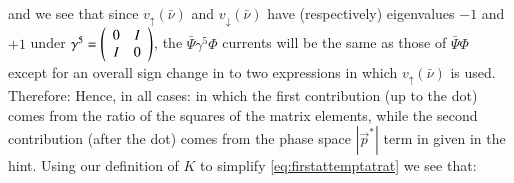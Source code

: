 \begin{allparts}
{}%
%
%
%
%
%
%
and we see that since $v_\uparrow(\bar \nu)$  and $v_\downarrow(\bar \nu)$ have (respectively) eigenvalues $-1$ and $+1$ under $\gamma^ 5=\left(\begin{array}{cc} 0 & I \\ I & 0 \end{array}\right)$, the $\bar \Psi \gamma^5 \Phi$ currents will be the same as those of $\bar \Psi  \Phi$ except for an overall sign change in to two expressions in which $v_\uparrow(\bar \nu)$ is used.  Therefore:
%
%
%
%
%
%
%
Hence, in all cases:
%
in which the first contribution (up to the dot) comes from the ratio of the squares of the matrix elements, while the second contribution (after the dot) comes from the phase space $|\vec p^*|$ term in  given in the hint. Using our definition of $K$ to simplify  \eqref{eq:firstattemptatrat} we see that:
\end{allparts}
